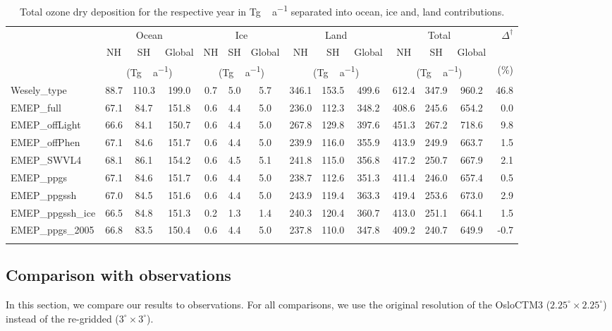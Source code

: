 \documentclass[gmd, manuscript]{copernicus}
\begin{document}
\begin{table*}[t]
\caption{Total ozone dry deposition for the respective year in \unit{Tg\,a^{-1}} separated into ocean, ice and, land contributions.}
\begin{tabular}{lccccccccccccr}
\tophline
\multirow{3}{*}{Simulation} & \multicolumn{3}{c}{Ocean} & \multicolumn{3}{c}{Ice} & \multicolumn{3}{c}{Land} & \multicolumn{3}{c}{Total} & $\Delta^\dagger$\\
& NH & SH & Global & NH & SH & Global & NH & SH & Global & NH & SH & Global\\
& \multicolumn{3}{c}{(\unit{Tg\,a^{-1}})} & \multicolumn{3}{c}{(\unit{Tg\,a^{-1}})} & \multicolumn{3}{c}{(\unit{Tg\,a^{-1}})} & \multicolumn{3}{c}{(\unit{Tg\,a^{-1}})} & (\unit{\%})\\
\middlehline
Wesely\_type & 88.7 & 110.3 & 199.0 & 0.7 & 5.0 & 5.7 & 346.1 & 153.5 & 499.6 & 612.4 & 347.9 & 960.2 & 46.8\\
EMEP\_full & 67.1 & 84.7 & 151.8 & 0.6 & 4.4 & 5.0 & 236.0 & 112.3 & 348.2 & 408.6 & 245.6 & 654.2 & 0.0\\
EMEP\_offLight & 66.6 & 84.1 & 150.7 & 0.6 & 4.4 & 5.0 & 267.8 & 129.8 & 397.6 & 451.3 & 267.2 & 718.6 & 9.8\\
EMEP\_offPhen & 67.1 & 84.6 & 151.7 & 0.6 & 4.4 & 5.0 & 239.9 & 116.0 & 355.9 & 413.9 & 249.9 & 663.7 & 1.5\\
EMEP\_SWVL4 & 68.1 & 86.1 & 154.2 & 0.6 & 4.5 & 5.1 & 241.8 & 115.0 & 356.8 & 417.2 & 250.7 & 667.9 & 2.1\\
EMEP\_ppgs & 67.1 & 84.6 & 151.7 & 0.6 & 4.4 & 5.0 & 238.7 & 112.6 & 351.3 & 411.4 & 246.0 & 657.4 & 0.5\\
EMEP\_ppgssh & 67.0 & 84.5 & 151.6 & 0.6 & 4.4 & 5.0 & 243.9 & 119.4 & 363.3 & 419.4 & 253.6 & 673.0 & 2.9\\
EMEP\_ppgssh\_ice & 66.5 & 84.8 & 151.3 & 0.2 & 1.3 & 1.4 & 240.3 & 120.4 & 360.7 & 413.0 & 251.1 & 664.1 & 1.5\\
EMEP\_ppgs\_2005 & 66.8 & 83.5 & 150.4 & 0.6 & 4.4 & 5.0 & 237.8 & 110.0 & 347.8 & 409.2 & 240.7 & 649.9 & -0.7\\
\bottomhline
\end{tabular}
\label{tab:ozone_sinks}
\end{table*}
%

\subsection{Comparison with observations}
\label{subsec:obs}
In this section, we compare our results to observations. For all comparisons, we use the original resolution of the OsloCTM3 ($2.25^\circ\times 2.25^\circ$) instead of the re-gridded ($3^\circ\times 3^\circ$).
\end{document}
